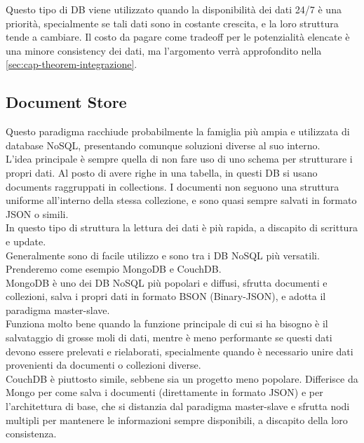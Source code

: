 \noindent Questo tipo di DB viene utilizzato quando la disponibilità dei dati 24/7 è una priorità, specialmente se tali dati sono in costante crescita, e la loro struttura tende a cambiare. Il costo da pagare come tradeoff per le potenzialità elencate è una minore consistency dei dati, ma l'argomento verrà approfondito nella \autoref{sec:cap-theorem-integrazione}.

\subsection{Document Store}
Questo paradigma racchiude probabilmente la famiglia più ampia e utilizzata di database NoSQL, presentando comunque soluzioni diverse al suo interno.\\
L'idea principale è sempre quella di non fare uso di uno schema per strutturare i propri dati. Al posto di avere righe in una tabella, in questi DB si usano documents raggruppati in collections. I documenti non seguono una struttura uniforme all'interno della stessa collezione, e sono quasi sempre salvati in formato JSON o simili.\\
In questo tipo di struttura la lettura dei dati è più rapida, a discapito di scrittura e update.\\
Generalmente sono di facile utilizzo e sono tra i DB NoSQL più versatili.\\

\noindent Prenderemo come esempio MongoDB e CouchDB.\\
MongoDB è uno dei DB NoSQL più popolari e diffusi, sfrutta documenti e collezioni, salva i propri dati in formato BSON (Binary-JSON), e adotta il paradigma master-slave.\\
Funziona molto bene quando la funzione principale di cui si ha bisogno è il salvataggio di grosse moli di dati, mentre è meno performante se questi dati devono essere prelevati e rielaborati, specialmente quando è necessario unire dati provenienti da documenti o collezioni diverse.\\
CouchDB è piuttosto simile, sebbene sia un progetto meno popolare. Differisce da Mongo per come salva i documenti (direttamente in formato JSON) e per l'architettura di base, che si distanzia dal paradigma master-slave e sfrutta nodi multipli per mantenere le informazioni sempre disponibili, a discapito della loro consistenza.\\

